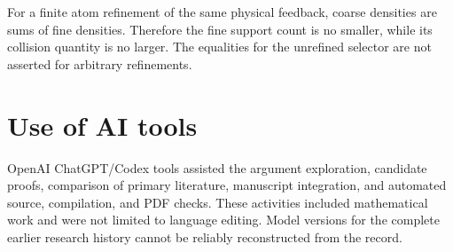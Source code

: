 \documentclass[11pt,reqno]{amsart}
\numberwithin{equation}{section}
\theoremstyle{definition}
\theoremstyle{definition}
\begin{document}
For a finite atom refinement of the same physical feedback,
coarse densities are sums of fine densities. Therefore the
fine support count is no smaller, while its collision quantity
is no larger. The equalities for the unrefined selector are
not asserted for arbitrary refinements.


\section*{Use of AI tools}
OpenAI ChatGPT/Codex tools assisted the argument exploration,
candidate proofs, comparison of primary literature, manuscript
integration, and automated source, compilation, and PDF checks.
These activities included mathematical work and were not limited
to language editing. Model versions for the complete earlier
research history cannot be reliably reconstructed from the record.
\end{document}
